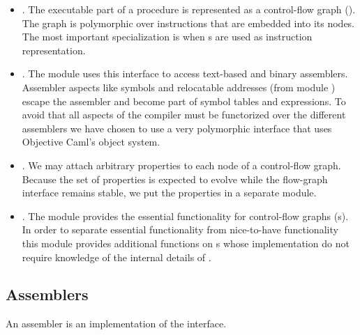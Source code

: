 \documentclass{article}%
\begin{document}
\begin{itemize}

\item {}.  The executable part of a procedure is
represented as a control-flow graph (\cfg). The graph is polymorphic
over instructions that are embedded into its nodes. The most important
specialization is when {\rtl}s are used as instruction representation.

\item {}.  The  module uses
this interface to access text-based and binary assemblers. Assembler
aspects like symbols and relocatable addresses (from module
) escape the assembler and become part of symbol
tables and expressions.  To avoid that all aspects of the compiler must
be functorized over the different assemblers we have chosen to use a
very polymorphic interface that uses Objective Caml's object system.

\item {}. We may attach arbitrary properties to
each node of a control-flow graph.  Because the set of properties is
expected to evolve while the flow-graph interface remains stable, we put
the properties in a separate module.

\item {}. The  module provides
the essential functionality for control-flow graphs ({\cfg}s). In order
to separate essential functionality from nice-to-have functionality this
module provides additional functions on {\cfg}s whose implementation do
not require knowledge of the internal details of .

\end{itemize}

\subsection{Assemblers}

An assembler is an implementation of the  interface. 
\end{document}
